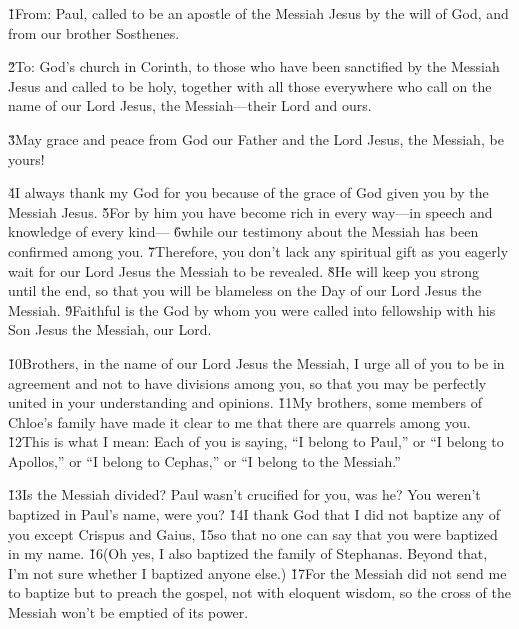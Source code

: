 


\v{1}From: Paul, called to be an apostle of the Messiah Jesus by the will of God, and from our brother Sosthenes.

\v{2}To: God's church in Corinth, to those who have been sanctified by the Messiah Jesus and called to be holy, together with all those everywhere who call on the name of our Lord Jesus, the Messiah---their Lord and ours.

\v{3}May grace and peace from God our Father and the Lord Jesus, the Messiah, be yours!

\v{4}I always thank my God for you because of the grace of God given you by the Messiah Jesus. \v{5}For by him you have become rich in every way---in speech and knowledge of every kind--- \v{6}while our testimony about the Messiah has been confirmed among you. \v{7}Therefore, you don't lack any spiritual gift as you eagerly wait for our Lord Jesus the Messiah to be revealed. \v{8}He will keep you strong until the end, so that you will be blameless on the Day of our Lord Jesus the Messiah. \v{9}Faithful is the God by whom you were called into fellowship with his Son Jesus the Messiah, our Lord.

\v{10}Brothers, in the name of our Lord Jesus the Messiah, I urge all of you to be in agreement and not to have divisions among you, so that you may be perfectly united in your understanding and opinions. \v{11}My brothers, some members of Chloe's family have made it clear to me that there are quarrels among you. \v{12}This is what I mean: Each of you is saying, ``I belong to Paul,'' or ``I belong to Apollos,'' or ``I belong to Cephas,'' or ``I belong to the Messiah.''

\v{13}Is the Messiah divided? Paul wasn't crucified for you, was he? You weren't baptized in Paul's name, were you? \v{14}I thank God that I did not baptize any of you except Crispus and Gaius, \v{15}so that no one can say that you were baptized in my name. \v{16}(Oh yes, I also baptized the family of Stephanas. Beyond that, I'm not sure whether I baptized anyone else.) \v{17}For the Messiah did not send me to baptize but to preach the gospel, not with eloquent wisdom, so the cross of the Messiah won't be emptied of its power.

